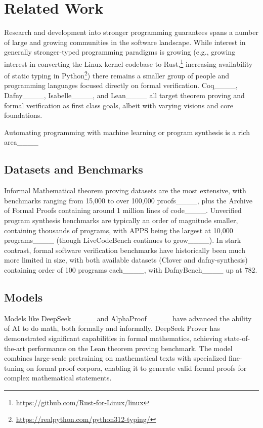\section{Related Work}
Research and development into stronger programming guarantees spans a number of large and growing communities in the software landscape.
While interest in generally stronger-typed programming paradigms is growing (e.g., growing interest in converting the Linux kernel codebase to Rust,\footnote{\url{https://github.com/Rust-for-Linux/linux}}
increasing availability of static typing in Python\footnote{\url{https://realpython.com/python312-typing/}}) there remains a smaller group of people and programming languages focused directly on formal verification.
Coq____, Dafny____, Isabelle____, and Lean____ all target theorem proving and formal verification as first class goals, albeit with varying visions and core foundations.

Automating programming with machine learning or program synthesis is a rich area____

\subsection{Datasets and Benchmarks}

Informal Mathematical theorem proving datasets are the most extensive, with benchmarks ranging from 15,000 to over 100,000 proofs____, plus the Archive of Formal Proofs containing around 1 million lines of code____. Unverified program synthesis benchmarks are typically an order of magnitude smaller, containing thousands of programs, with APPS being the largest at 10,000 programs____ (though LiveCodeBench continues to grow____). In stark contrast, formal software verification benchmarks have historically been much more limited in size, with both available datasets (Clover and dafny-synthesis) containing order of 100 programs each____, with DafnyBench____ up at 782.

\subsection{Models}

Models like DeepSeek ____ and AlphaProof ____ have advanced the ability of AI to do math, both formally and informally. DeepSeek Prover has demonstrated significant capabilities in formal mathematics, achieving state-of-the-art performance on the Lean theorem proving benchmark. The model combines large-scale pretraining on mathematical texts with specialized fine-tuning on formal proof corpora, enabling it to generate valid formal proofs for complex mathematical statements.

